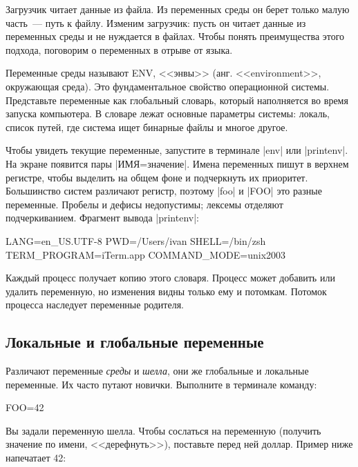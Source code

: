Загрузчик читает данные из файла. Из переменных среды он берет только малую
часть~--- путь к файлу. Изменим загрузчик: пусть он читает данные из переменных
среды и не нуждается в файлах. Чтобы понять преимущества этого подхода,
поговорим о переменных в отрыве от языка.

Переменные среды называют ENV, <<энвы>> (анг. <<environment>>, окружающая
среда). Это фундаментальное свойство операционной системы. Представьте
переменные как глобальный словарь, который наполняется во время запуска
компьютера. В словаре лежат основные параметры системы: локаль, список путей,
где система ищет бинарные файлы и многое другое.

Чтобы увидеть текущие переменные, запустите в терминале \spverb|env| или
\spverb|printenv|. На экране появится пары \spverb|ИМЯ=значение|. Имена
переменных пишут в верхнем регистре, чтобы выделить на общем фоне и подчеркнуть
их приоритет. Большинство систем различают регистр, поэтому \spverb|foo| и
\spverb|FOO| это разные переменные. Пробелы и дефисы недопустимы; лексемы
отделяют подчеркиванием. Фрагмент вывода \spverb|printenv|:

\begin{english}
  \begin{bash}
LANG=en_US.UTF-8
PWD=/Users/ivan
SHELL=/bin/zsh
TERM_PROGRAM=iTerm.app
COMMAND_MODE=unix2003
  \end{bash}
\end{english}

Каждый процесс получает копию этого словаря. Процесс может добавить или удалить
переменную, но изменения видны только ему и потомкам. Потомок процесса наследует
переменные родителя.

\subsection{Локальные и глобальные переменные}

Различают переменные \emph{среды} и \emph{шелла}, они же глобальные и локальные
переменные. Их часто путают новички. Выполните в терминале команду:

\begin{english}
  \begin{bash}
FOO=42
  \end{bash}
\end{english}

Вы задали переменную шелла. Чтобы сослаться на переменную (получить значение по
имени, <<дерефнуть>>), поставьте перед ней доллар. Пример ниже напечатает 42:

